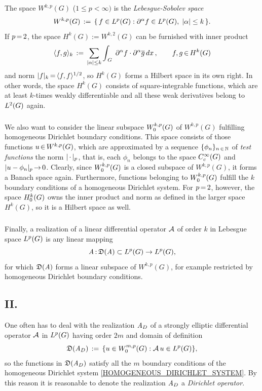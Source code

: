 \documentclass[11pt,twoside]{article}
\def\G{G}
\begin{document}
\begin{itemize}[leftmargin=4mm]
\subparagraph{} %
The space $W^{k,p}(\G)$ ($1 \leq p < \infty)$
is the \textit{Lebesgue-Sobolev space}
\[
W^{k,p}(\G) \eqdef
\{\,f \in \Lp: \PA f \in \Lp, \; \abs{\alpha} \leq k \, \}.
\]
If $p {\,=\,} 2$,
the space $H^k(\G) := W^{k,2}(\G)$ can be furnished with inner product
\[
\scalar{f}{g}_k \eqdef
\sum_{\abs{\alpha} \leq k} \int_{\,\G} \;
\PA f \cdot \PA \overline{g} \, dx\,,
\quad \quad f,g \xeof H^k(\G)
\]
and norm
$\abs{f} _k \eq \scalar{f}{f}^{1/2}$,
so $H^k(\G)$ forms a Hilbert space in its own right.
In other words,
the space $H^k(\G)$ consists of square-integrable functions,
which are at least $k$-times {weakly differentiable}
and all these weak derivatives belong to $\Lh$ again.

\subparagraph{} %
We also want to consider the linear subspace $\WN{k,p}{\G}$ of $W^{k,p}(\G)$
fulfilling homogeneous Dirichlet boundary conditions.
This space consists of those functions $u \xeof W^{k,p}(\G)$,
which are approximated by a sequence $\{\phi_n\}_{n {\,\in\,} {\mathbb{N}}}$
of \textit{test functions} {\wrt} the norm $\abs{\,\cdot\,} _p$,
that is,
each $\phi_n$ belongs to the space $\TF$ and $\abs{u - \phi_n} _p \xto 0$. 
Clearly,
since $\WN{k,p}{\G}$ is a closed subspace of $W^{k,p}(\G)$,
it forms a Banach space again.
Furthermore,
functions belonging to $\WN{k,p}{\G}$ fulfill the $k$ boundary conditions
of a homogeneous Dirichlet system.
For $p {\,=\,} 2$,
however,
the space $\HN{k}{\G}$ owns the inner product and norm
as defined in the larger space $H^k(\G)$,
so it is a Hilbert space as well.

\subparagraph{}
Finally,
a realization of a linear differential operator ${\mathcal{A}}$ of order $k$
in Lebesgue space $\Lp$ is any linear mapping
\[
\linA \: \domain{\linA} \subset \Lp \to \Lp,
\]
for which $\mathfrak{D}(\mathit{A})$ forms a linear subspace of $W^{k,p}(\G)$,
for example restricted by homogeneous Dirichlet boundary conditions.
\end{itemize}

\subsection*{II. \TITLEB}
One often has to deal with the realization $\mathit{A}_D$
of a strongly elliptic differential operator ${\mathcal{A}}$ in $\Lp$
having order $2m$ and domain of definition
\[
\domain{\linA_D} \eqdef \{ u \in \WN{m,p}{\G}: \A\,u \in \Lp \},
\]
so the functions in $\mathfrak{D}(\mathit{A}_D)$ satisfy all the $m$ boundary conditions
of the homogeneous Dirichlet system \eqref{HOMOGENEOUS_DIRICHLET_SYSTEM}.
By this reason it is reasonable to denote the realization $\mathit{A}_D$
a \textit{Dirichlet operator}.
\end{document}
